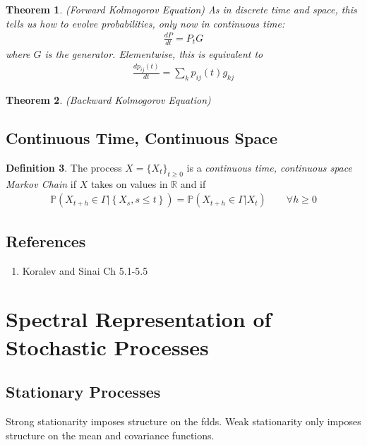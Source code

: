 \documentclass[12pt]{article}
\theoremstyle{plain}
\newtheorem{thm}{Theorem}[section]
\theoremstyle{definition}
\newtheorem{defn}[thm]{Definition}
\theoremstyle{remark}
\begin{document}
\begin{thm}{\emph{(Forward Kolmogorov Equation)}}
As in discrete time and space, this tells us how to evolve
probabilities, only now in continuous time:
\begin{align*}
  \frac{dP}{dt} = P_t G
\end{align*}
where $G$ is the generator. Elementwise, this is equivalent to
\begin{align*}
  \frac{dp_{ij}(t)}{dt} = \sum_k p_{ij}(t) g_{kj}
\end{align*}
\end{thm}

\begin{thm}{\emph{(Backward Kolmogorov Equation)}}
\end{thm}


\subsection{Continuous Time, Continuous Space}

\begin{defn}
The process $X=\{X_t\}_{t\geq 0}$ is a \emph{continuous time, continuous
space Markov Chain} if $X$ takes on values in $\mathbb{R}$ and if
\begin{align*}
  \mathbb{P}\left(X_{t+h} \in \Gamma | \left\{ X_{s}, s\leq t\right\}\right)
  =
  \mathbb{P}(X_{t+h} \in \Gamma | X_{t} )
  \qquad \forall h \geq 0
\end{align*}
\end{defn}



\subsection{References}
\begin{enumerate}
  \item Koralev and Sinai Ch 5.1-5.5
\end{enumerate}

\clearpage
\section{Spectral Representation of Stochastic Processes}

\subsection{Stationary Processes}

Strong stationarity imposes structure on the fdds. Weak stationarity
only imposes structure on the mean and covariance functions.
\end{document}
